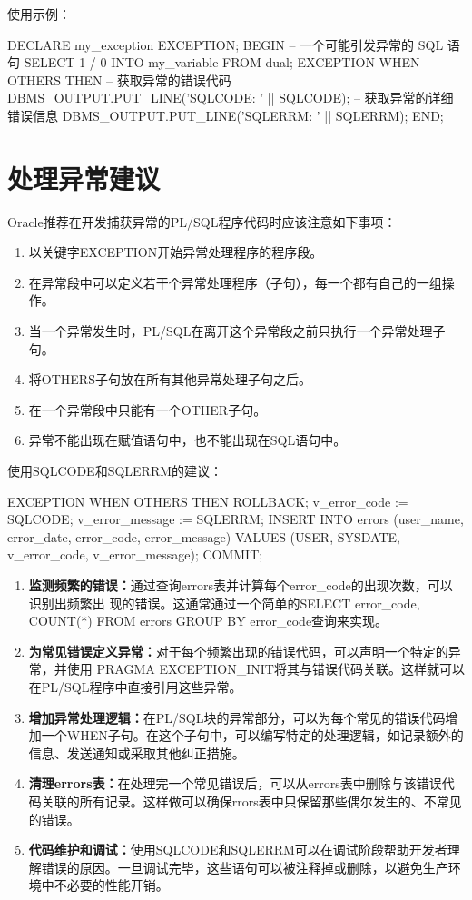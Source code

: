\documentclass[11pt, a4paper, oneside, UTF8]{ctexbook}
\let\kaishu\relax %
\begin{document}
使用示例：
\begin{plsql}[caption=SQLCODE和SQLERRM示例代码]
DECLARE
  my_exception EXCEPTION;
BEGIN
  -- 一个可能引发异常的 SQL 语句
  SELECT 1 / 0 INTO my_variable FROM dual;
EXCEPTION
  WHEN OTHERS THEN
    -- 获取异常的错误代码
    DBMS_OUTPUT.PUT_LINE('SQLCODE: ' || SQLCODE);
    -- 获取异常的详细错误信息
    DBMS_OUTPUT.PUT_LINE('SQLERRM: ' || SQLERRM);
END;
\end{plsql}

\section{处理异常建议}
Oracle推荐在开发捕获异常的PL/SQL程序代码时应该注意如下事项：
\begin{enumerate}
  \item 以关键字EXCEPTION开始异常处理程序的程序段。
  \item 在异常段中可以定义若干个异常处理程序（子句），每一个都有自己的一组操作。
  \item 当一个异常发生时，PL/SQL在离开这个异常段之前只执行一个异常处理子句。
  \item 将OTHERS子句放在所有其他异常处理子句之后。
  \item 在一个异常段中只能有一个OTHER子句。
  \item 异常不能出现在赋值语句中，也不能出现在SQL语句中。
\end{enumerate}

使用SQLCODE和SQLERRM的建议：
\begin{plsql}[caption=记录异常（需先建立错误记录表）]
EXCEPTION
  WHEN OTHERS THEN
    ROLLBACK;
    v_error_code := SQLCODE;
    v_error_message := SQLERRM;
    INSERT INTO errors (user_name, error_date, error_code, error_message)
    VALUES (USER, SYSDATE, v_error_code, v_error_message);
    COMMIT;
\end{plsql}
\begin{enumerate}
  \item {\bfseries\kaishu 监测频繁的错误：}通过查询errors表并计算每个error\_code的出现次数，可以识别出频繁出  现的错误。这通常通过一个简单的SELECT error\_code, COUNT(*) FROM errors GROUP BY error\_code查询来实现。
  \item {\bfseries\kaishu 为常见错误定义异常：}对于每个频繁出现的错误代码，可以声明一个特定的异常，并使用 PRAGMA EXCEPTION\_INIT将其与错误代码关联。这样就可以在PL/SQL程序中直接引用这些异常。
  \item {\bfseries\kaishu 增加异常处理逻辑：}在PL/SQL块的异常部分，可以为每个常见的错误代码增加一个WHEN子句。在这个子句中，可以编写特定的处理逻辑，如记录额外的信息、发送通知或采取其他纠正措施。
  \item {\bfseries\kaishu 清理errors表：}在处理完一个常见错误后，可以从errors表中删除与该错误代码关联的所有记录。这样做可以确保rrors表中只保留那些偶尔发生的、不常见的错误。
  \item {\bfseries\kaishu 代码维护和调试：}使用SQLCODE和SQLERRM可以在调试阶段帮助开发者理解错误的原因。一旦调试完毕，这些语句可以被注释掉或删除，以避免生产环境中不必要的性能开销。
\end{enumerate}
\end{document}
